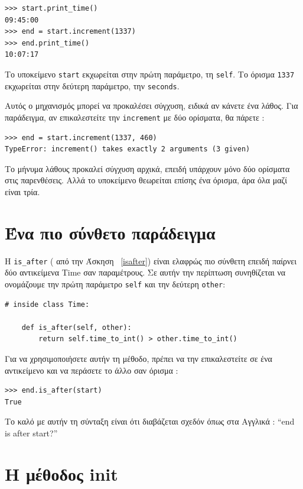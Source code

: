 \documentclass[10pt]{book}
\begin{document}
\begin{verbatim}
>>> start.print_time()
09:45:00
>>> end = start.increment(1337)
>>> end.print_time()
10:07:17
\end{verbatim}
%
 Το υποκείμενο  {\tt start}  εκχωρείται στην πρώτη παράμετρο, τη  {\tt self}.  
 Το όρισμα  {\tt 1337}  εκχωρείται στην δεύτερη παράμετρο, την  {\tt seconds}.

 Αυτός ο μηχανισμός μπορεί να προκαλέσει σύγχυση, ειδικά αν κάνετε ένα λάθος. 
Για παράδειγμα, αν επικαλεστείτε την  {\tt increment}  με δύο ορίσματα, θα πάρετε :

\begin{verbatim}
>>> end = start.increment(1337, 460)
TypeError: increment() takes exactly 2 arguments (3 given)
\end{verbatim}
%
 Το μήνυμα λάθους προκαλεί σύγχυση αρχικά, επειδή υπάρχουν μόνο δύο ορίσματα στις παρενθέσεις.  Αλλά το υποκείμενο θεωρείται επίσης ένα όρισμα, άρα όλα μαζί είναι τρία.


\section{Ένα πιο σύνθετο παράδειγμα}

Η  \verb"is_after" ( από την Άσκηση~ \ref{isafter})  είναι ελαφρώς πιο σύνθετη 
επειδή παίρνει δύο αντικείμενα  Time  σαν παραμέτρους.  Σε αυτήν την περίπτωση συνηθίζεται να ονομάζουμε την πρώτη παράμετρο  {\tt self}  και την δεύτερη  {\tt other}:

\begin{verbatim}
# inside class Time:

    def is_after(self, other):
        return self.time_to_int() > other.time_to_int()
\end{verbatim}
%
 Για να χρησιμοποιήσετε αυτήν τη μέθοδο, πρέπει να την επικαλεστείτε σε ένα αντικείμενο και να περάσετε το άλλο σαν όρισμα :

\begin{verbatim}
>>> end.is_after(start)
True
\end{verbatim}
%
 Το καλό με αυτήν τη σύνταξη είναι ότι διαβάζεται σχεδόν όπως στα Αγγλικά :
``end is after start?''



\section{Η μέθοδος {init}}
\end{document}
